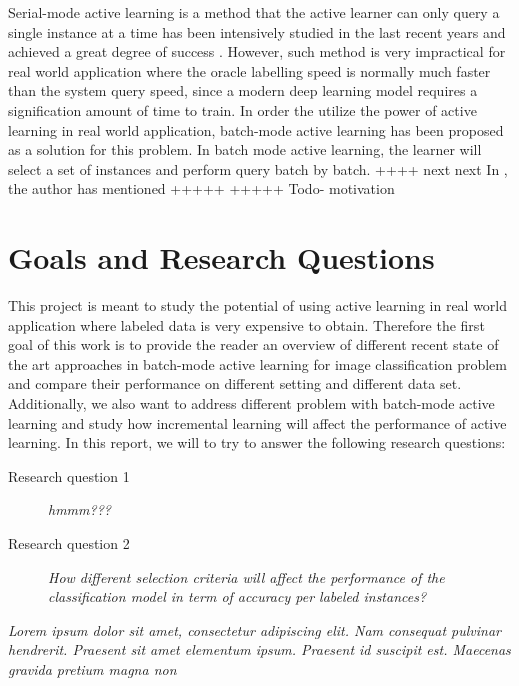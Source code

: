 Serial-mode active learning is a method that the active learner can only query a single instance at a time has been intensively studied in the last recent years and achieved a great degree of success \citet{activelearningbook}. However, such method is very impractical for real world application where the oracle labelling speed is normally much faster than the system query speed, since a modern deep learning model requires a signification amount of time to train. In order the utilize the power of active learning in real world application, batch-mode active learning has been proposed as a solution for this problem. In batch mode active learning, the learner will select a set of instances and perform query batch by batch. 
++++ next next
In \citet{activelearningbook}, the author has mentioned 
+++++
+++++
Todo- motivation 


\section{Goals and Research Questions}
\label{sec:Goals and Research Questions}
This project is meant to study the potential of using active learning in real world application where labeled data is very expensive to obtain. Therefore the first goal of this work is to provide the reader an overview of different recent state of the art approaches in batch-mode active learning for image classification problem and compare their performance on different setting and different data set. Additionally, we also want to address different problem with batch-mode active learning and study how incremental learning will affect the performance of active learning. In this report, we will to try to answer the following research questions:

\begin{description}
\item[Research question 1] {\it hmmm???   }
\end{description}

\begin{description}
\item[Research question 2] {\it How different selection criteria will affect the performance of the classification model in term of accuracy per labeled instances? }
\end{description}



{\it Lorem ipsum dolor sit amet, consectetur adipiscing elit. Nam consequat pulvinar hendrerit. Praesent sit amet elementum ipsum. Praesent id suscipit est. Maecenas gravida pretium magna non }

